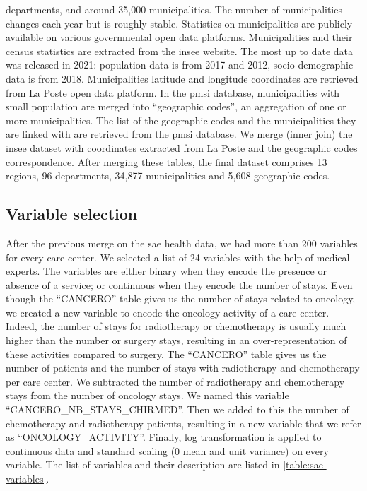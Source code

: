departments, and around 35,000 municipalities. The number of municipalities
changes each year but is roughly stable. Statistics on municipalities are
publicly available on various governmental open data platforms. Municipalities
and their census statistics are extracted from the \ac{insee} website. The most
up to date data was released in 2021: population data is from 2017 and 2012,
socio-demographic data is from 2018. Municipalities latitude and longitude
coordinates are retrieved from La Poste open data platform. In the \ac{pmsi}
database, municipalities with small population are merged into ``geographic
codes'', an aggregation of one or more municipalities. The list of the
geographic codes and the municipalities they are linked with are retrieved from
the \ac{pmsi} database. We merge (inner join) the \ac{insee} dataset with
coordinates extracted from La Poste and the geographic codes correspondence.
After merging these tables, the final dataset comprises 13 regions, 96
departments, 34,877 municipalities and 5,608 geographic codes.

\subsection{Variable selection}

After the previous merge on the \ac{sae} health data, we had more than 200
variables for every care center. We selected a list of 24 variables with the
help of medical experts. The variables are either binary when they encode the
presence or absence of a service; or continuous when they encode the number of
stays. Even though the ``CANCERO'' table gives us the number of stays related to
oncology, we created a new variable to encode the oncology activity of a care
center. Indeed, the number of stays for radiotherapy or chemotherapy is usually
much higher than the number or surgery stays, resulting in an
over-representation of these activities compared to surgery. The ``CANCERO''
table gives us the number of patients and the number of stays with radiotherapy
and chemotherapy per care center. We subtracted the number of radiotherapy and
chemotherapy stays from the number of oncology stays. We named this variable
``CANCERO\_NB\_STAYS\_CHIRMED''. Then we added to this the number of
chemotherapy and radiotherapy patients, resulting in a new variable that we
refer as ``ONCOLOGY\_ACTIVITY''. Finally, log transformation is applied to
continuous data and standard scaling (0 mean and unit variance) on every
variable. The list of variables and their description are listed in
\cref{table:sae-variables}.

